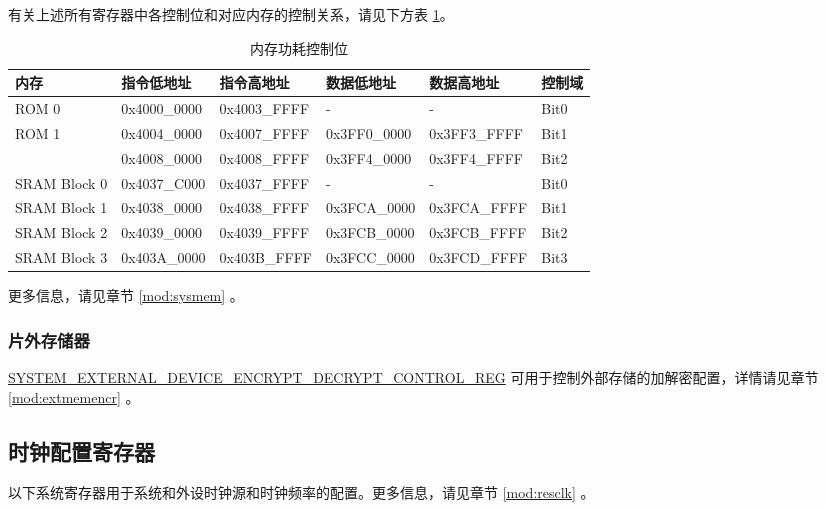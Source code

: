 \documentclass[main\_\_CN.tex]{subfiles}
\begin{document}
有关上述所有寄存器中各控制位和对应内存的控制关系，请见下方表 \ref{tab:sysreg-mem-controlling-bit}。

\begin{longtable}[c]{| l | l | l |l | l | l |}
\caption{内存功耗控制位}
\label{tab:sysreg-mem-controlling-bit}
\\\hline
\rowcolor{lightgray}
        \textbf{内存} & \textbf{指令低地址} & \textbf{指令高地址} & \textbf{数据低地址} & \textbf{数据高地址} & \textbf{控制域} \\ \hline
        ROM 0  & 0x4000\_0000    & 0x4003\_FFFF  &- & -  & Bit0 \\\hline
        \multirow{ 2}{*}{ROM 1}  & 0x4004\_0000    & 0x4007\_FFFF  & 0x3FF0\_0000  & 0x3FF3\_FFFF & Bit1\\\cline{2-6}
          & 0x4008\_0000    & 0x4008\_FFFF  & 0x3FF4\_0000  & 0x3FF4\_FFFF & Bit2\\\hline
        SRAM Block 0  & 0x4037\_C000    & 0x4037\_FFFF  & - & -  & Bit0 \\\hline
        SRAM Block 1  & 0x4038\_0000    & 0x4038\_FFFF  & 0x3FCA\_0000  & 0x3FCA\_FFFF & Bit1\\\hline
        SRAM Block 2  & 0x4039\_0000    & 0x4039\_FFFF  & 0x3FCB\_0000  & 0x3FCB\_FFFF & Bit2\\\hline
        SRAM Block 3  & 0x403A\_0000    & 0x403B\_FFFF  & 0x3FCC\_0000  & 0x3FCD\_FFFF & Bit3\\\hline
\end{longtable}

更多信息，请见章节 \ref{mod:sysmem} \textit{}。

\subsubsection{片外存储器}

\hyperref[regdesc:SYSTEMEXTERNALDEVICEENCRYPTDECRYPTCONTROLREG]{SYSTEM\_EXTERNAL\_DEVICE\_ENCRYPT\_DECRYPT\_CONTROL\_REG} 可用于控制外部存储的加解密配置，详情请见章节 \ref{mod:extmemencr}
\textit{}。




\subsection{时钟配置寄存器}

以下系统寄存器用于系统和外设时钟源和时钟频率的配置。更多信息，请见章节 \ref{mod:resclk}
\textit{}。
\end{document}
